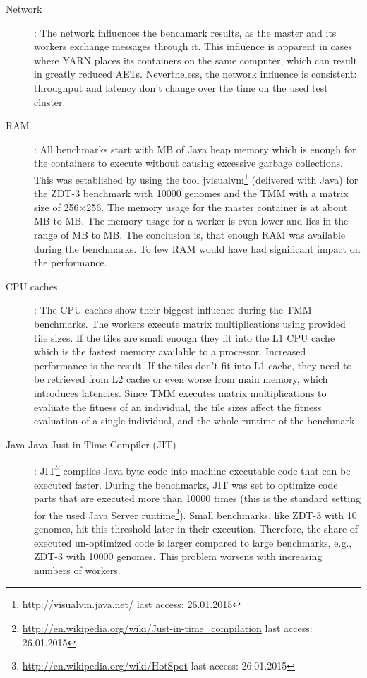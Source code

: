 \begin{description}
  \item [Network]: The network influences the benchmark results, as the master and its workers exchange messages through it. This influence is apparent in cases where YARN places its containers on the same computer, which can result in greatly reduced AETs. Nevertheless, the network influence is consistent: throughput and latency don't change over the time on the used test cluster.
  \item [RAM]: All benchmarks start with \unit[256]{MB} of Java heap memory which is enough for the containers to execute without causing excessive garbage collections. This was established by using the tool jvisualvm\footnote{\url{http://visualvm.java.net/} last access: 26.01.2015} (delivered with Java) for the ZDT-3 benchmark with 10000 genomes and the TMM with a matrix size of 256$\times$256. The memory usage for the master container is at about \unit[100]{MB} to \unit[150]{MB}. The memory usage for a worker is even lower and lies in the range of \unit[5]{MB} to \unit[30]{MB}. The conclusion is, that enough RAM was available during the benchmarks. To few RAM would have had significant impact on the performance.
  \item [CPU caches]: The CPU caches show their biggest influence during the TMM benchmarks. The workers execute matrix multiplications using provided tile sizes. If the tiles are small enough they fit into the L1 CPU cache which is the fastest memory available to a processor. Increased performance is the result. If the tiles don't fit into L1 cache, they need to be retrieved from L2 cache or even worse from main memory, which introduces latencies. Since TMM executes matrix multiplications to evaluate the fitness of an individual, the tile sizes affect the fitness evaluation of a single individual, and the whole runtime of the benchmark.
  \item [Java Java Just in Time Compiler (JIT)]: JIT\footnote{\url{http://en.wikipedia.org/wiki/Just-in-time_compilation} last access: 26.01.2015} compiles Java byte code into machine executable code that can be executed faster. During the benchmarks, JIT was set to optimize code parts that are executed more than 10000 times (this is the standard setting for the used Java Server runtime\footnote{\url{http://en.wikipedia.org/wiki/HotSpot} last access: 26.01.2015}). Small benchmarks, like ZDT-3 with 10 genomes, hit this threshold later in their execution. Therefore, the share of executed un-optimized code is larger compared to large benchmarks, e.g., ZDT-3 with 10000 genomes. This problem worsens with increasing numbers of workers.

\end{description}
